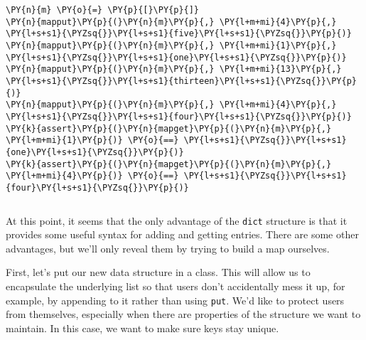 \begin{Verbatim}[commandchars=\\\{\}]
\PY{n}{m} \PY{o}{=} \PY{p}{[}\PY{p}{]}
\PY{n}{mapput}\PY{p}{(}\PY{n}{m}\PY{p}{,} \PY{l+m+mi}{4}\PY{p}{,} \PY{l+s+s1}{\PYZsq{}}\PY{l+s+s1}{five}\PY{l+s+s1}{\PYZsq{}}\PY{p}{)}
\PY{n}{mapput}\PY{p}{(}\PY{n}{m}\PY{p}{,} \PY{l+m+mi}{1}\PY{p}{,} \PY{l+s+s1}{\PYZsq{}}\PY{l+s+s1}{one}\PY{l+s+s1}{\PYZsq{}}\PY{p}{)}
\PY{n}{mapput}\PY{p}{(}\PY{n}{m}\PY{p}{,} \PY{l+m+mi}{13}\PY{p}{,} \PY{l+s+s1}{\PYZsq{}}\PY{l+s+s1}{thirteen}\PY{l+s+s1}{\PYZsq{}}\PY{p}{)}
\PY{n}{mapput}\PY{p}{(}\PY{n}{m}\PY{p}{,} \PY{l+m+mi}{4}\PY{p}{,} \PY{l+s+s1}{\PYZsq{}}\PY{l+s+s1}{four}\PY{l+s+s1}{\PYZsq{}}\PY{p}{)}
\PY{k}{assert}\PY{p}{(}\PY{n}{mapget}\PY{p}{(}\PY{n}{m}\PY{p}{,} \PY{l+m+mi}{1}\PY{p}{)} \PY{o}{==} \PY{l+s+s1}{\PYZsq{}}\PY{l+s+s1}{one}\PY{l+s+s1}{\PYZsq{}}\PY{p}{)}
\PY{k}{assert}\PY{p}{(}\PY{n}{mapget}\PY{p}{(}\PY{n}{m}\PY{p}{,} \PY{l+m+mi}{4}\PY{p}{)} \PY{o}{==} \PY{l+s+s1}{\PYZsq{}}\PY{l+s+s1}{four}\PY{l+s+s1}{\PYZsq{}}\PY{p}{)}
\end{Verbatim}

\begin{Verbatim}
\end{Verbatim}


At this point, it seems that the only advantage of the \texttt{dict} structure is that it provides some useful syntax for adding and getting entries.  There are some other advantages, but we'll only reveal them by trying to build a map ourselves.


First, let's put our new data structure in a class.  This will allow us to encapsulate the underlying list so that users don't accidentally mess it up, for example, by appending to it rather than using \texttt{put}.  We'd like to protect users from themselves, especially when there are properties of the structure we want to maintain.  In this case, we want to make sure keys stay unique.

